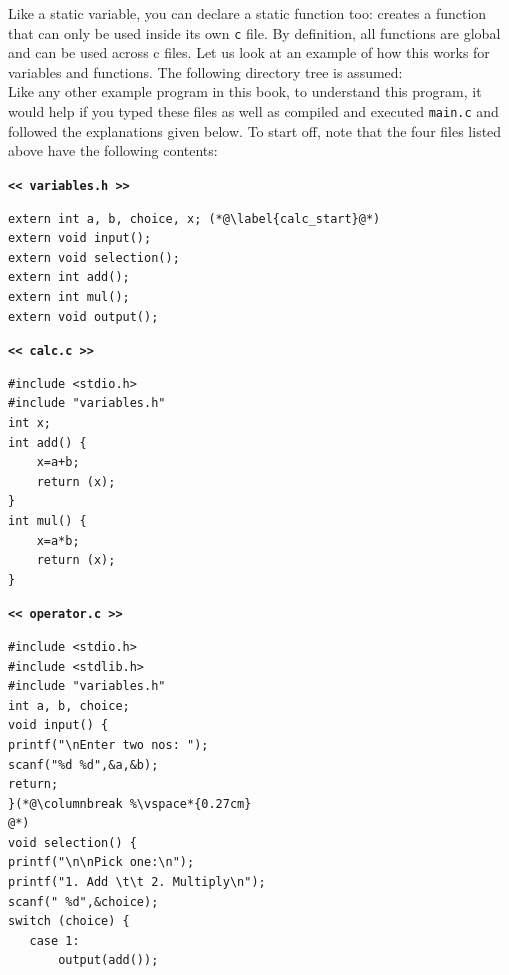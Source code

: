 \documentclass[11pt,oneside]{article}
\begin{document}
{{{{{{{{{{{{Like a static variable, you can declare a static function too:  creates a function that can only be used inside its own \verb+c+ file. By definition, all functions are global and can be used across c files. Let us look at an example of how this works for variables and functions. The following directory tree is assumed:\\[-0.25cm]
\DTsetlength{-0.1em}{2em}{0.4em}{0.8pt}{3.2pt}
\setlength{\DTbaselineskip}{20pt}
\vspace*{0.75cm}
Like any other example program in this book, to understand this program, it would help if you typed these files as well as compiled and executed \verb+main.c+ and followed the explanations given below. To start off, note that the four files listed above have the following contents:
\begin{multicols}{2}
\noindent\textbf{\texttt{<< variables.h >>}}\vspace{-0.5cm}
\begin{lstlisting}
extern int a, b, choice, x; (*@\label{calc_start}@*)
extern void input();
extern void selection();
extern int add();
extern int mul();
extern void output();
\end{lstlisting}
\textbf{\texttt{<< calc.c >>}}\vspace{-0.5cm}
\begin{lstlisting}
#include <stdio.h>
#include "variables.h"
int x;
int add() {
    x=a+b;
    return (x);
}
int mul() {
    x=a*b;
    return (x);
}
\end{lstlisting}
\textbf{\texttt{<< operator.c >>}}\vspace{-0.5cm}
\begin{lstlisting}
#include <stdio.h>
#include <stdlib.h>
#include "variables.h"
int a, b, choice;
void input() {
printf("\nEnter two nos: ");
scanf("%d %d",&a,&b);
return;
}(*@\columnbreak %\vspace*{0.27cm}
@*)
void selection() {
printf("\n\nPick one:\n");
printf("1. Add \t\t 2. Multiply\n");
scanf(" %d",&choice);
switch (choice) {
   case 1:
       output(add());

\end{lstlisting}
\end{multicols}}}}}}}}}}}}}
\end{document}

